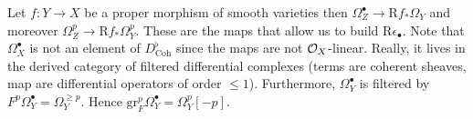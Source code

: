 \documentclass[12pt]{article}
\renewcommand{\gr}{\mathrm{gr}}
\newcommand{\R}{\mathrm{R}}
\begin{document}
Let $f : Y \to X$ be a proper morphism of smooth varieties then $\Omega_Z^\bullet \to \R f_* \Omega_Y$ and moreover $\Omega_Z^p \to \R f_* \Omega_Y^p$. These are the maps that allow us to build $\R \epsilon_{\bullet}$. Note that $\Omega_X^\bullet$ is not an element of $D^\flat_{\text{Coh}}$ since the maps are not $\mathcal{O}_{X}$-linear. Really, it lives in the derived category of filtered differential complexes (terms are coherent sheaves, map are differential operators of order $\le 1$). Furthermore, $\Omega_Y^\bullet$ is filtered by $F^p \Omega_Y^\bullet = \Omega_Y^{\ge p}$. Hence $\gr^p_F \Omega_Y^\bullet = \Omega_Y^p[-p]$. 
\end{document}
